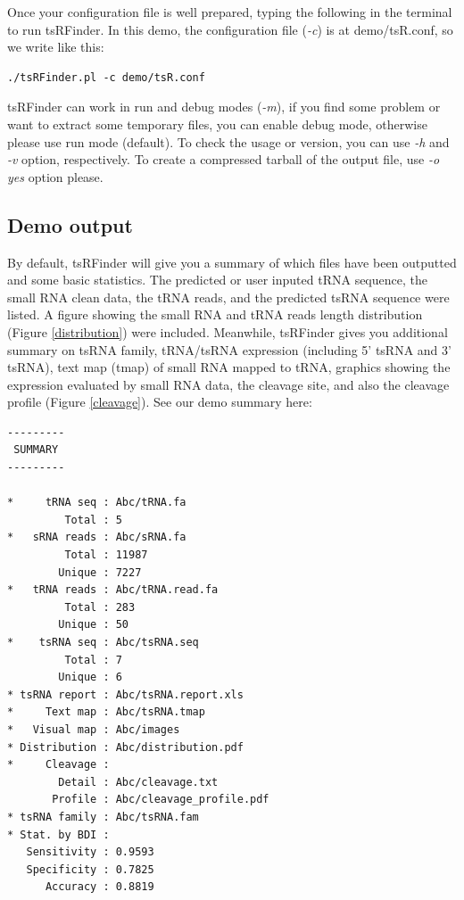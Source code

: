 \documentclass[11pt, a4paper]{article}
\begin{document}
Once your configuration file is well prepared, typing the following in the terminal to run tsRFinder. In this demo, the configuration file (\emph{-c}) is at demo/tsR.conf, so we write like this:

{\footnotesize \begin{tcolorbox}[colback=blue!5!white,colframe=blue!75!black,title=Running tsRFinder demo]
\begin{verbatim}
./tsRFinder.pl -c demo/tsR.conf
\end{verbatim}
\end{tcolorbox}}

tsRFinder can work in run and debug modes (\emph{-m}), if you find some problem or want to extract some temporary files, you can enable debug mode, otherwise please use run mode (default). To check the usage or version, you can use \emph{-h} and \emph{-v} option, respectively. To create a compressed tarball of the output file, use \emph{-o yes} option please.

\subsection{Demo output}

By default, tsRFinder will give you a summary of which files have been outputted and some basic statistics. The predicted or user inputed tRNA sequence, the small RNA clean data, the tRNA reads, and the predicted tsRNA sequence were listed. A figure showing the small RNA and tRNA reads length distribution (Figure \ref{distribution}) were included. Meanwhile, tsRFinder gives you additional summary on tsRNA family, tRNA/tsRNA expression (including 5' tsRNA and 3' tsRNA), text map (tmap) of small RNA mapped to tRNA, graphics showing the expression evaluated by small RNA data, the cleavage site, and also the cleavage profile (Figure \ref{cleavage}).
See our demo summary here:

{\footnotesize \begin{tcolorbox}[colback=blue!5!white,colframe=blue!75!black,title=tsRFinder demo output list]
\begin{verbatim}
---------
 SUMMARY 
---------

*     tRNA seq : Abc/tRNA.fa
         Total : 5
*   sRNA reads : Abc/sRNA.fa
         Total : 11987
        Unique : 7227
*   tRNA reads : Abc/tRNA.read.fa
         Total : 283
        Unique : 50
*    tsRNA seq : Abc/tsRNA.seq
         Total : 7
        Unique : 6
* tsRNA report : Abc/tsRNA.report.xls
*     Text map : Abc/tsRNA.tmap
*   Visual map : Abc/images
* Distribution : Abc/distribution.pdf
*     Cleavage :
        Detail : Abc/cleavage.txt
       Profile : Abc/cleavage_profile.pdf
* tsRNA family : Abc/tsRNA.fam
* Stat. by BDI :
   Sensitivity : 0.9593
   Specificity : 0.7825
      Accuracy : 0.8819
\end{verbatim}
\end{tcolorbox}}
\end{document}
